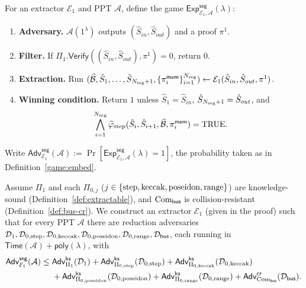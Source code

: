 \begin{definition}\label{game:segment}
For an extractor $\mathcal{E}_1$ and PPT $\mathcal{A}$, define the game
$\mathsf{Exp}^{\mathsf{seg}}_{\mathcal{E}_1,\mathcal{A}}(\lambda)$:
\begin{enumerate}
  \item \textbf{Adversary.} $\mathcal{A}(1^\lambda)$ outputs
    $(\hat{S}_{in},\hat{S}_{out})$ and a proof $\pi^1$.
  \item \textbf{Filter.} If
    $\Pi_1.\mathsf{Verify}((\hat{S}_{in},\hat{S}_{out}),\pi^1)=0$, return $0$.
  \item \textbf{Extraction.} Run
    $(\widehat{\mathcal{B}},\hat{S}_1,\ldots,\hat{S}_{N_{\mathrm{seg}}+1},\{\pi^{\mathsf{mem}}_i\}_{i=1}^{N_{\mathrm{seg}}})
    \leftarrow\mathcal{E}_1(\hat{S}_{in},\hat{S}_{out},\pi^1)$.
  \item \textbf{Winning condition.} Return $1$ unless
    $\hat{S}_1=\hat{S}_{in}$, $\hat{S}_{N_{\mathrm{seg}}+1}=\hat{S}_{out}$, and
    \[
      \bigwedge_{i=1}^{N_{\mathrm{seg}}}\widehat{\varphi}_{\mathrm{step}}(\hat{S}_i,\hat{S}_{i+1},\widehat{\mathcal{B}},\pi^{\mathsf{mem}}_i)=\mathrm{TRUE}.
    \]
\end{enumerate}
Write $\mathsf{Adv}^{\mathsf{seg}}_{\mathcal{E}_1}(\mathcal{A}) :=
\Pr[\mathsf{Exp}^{\mathsf{seg}}_{\mathcal{E}_1,\mathcal{A}}(\lambda)=1]$,
the probability taken as in Definition~\ref{game:embed}.
\end{definition}

\begin{lemma}\label{lem:segment}
Assume $\Pi_1$ and each $\Pi_{0,j}$ ($j\in\{\mathrm{step},\mathrm{keccak},\mathrm{poseidon},\mathrm{range}\}$)
are knowledge-sound (Definition~\ref{def:extractable}), and $\mathrm{Com}_{\mathsf{bus}}$
is collision-resistant (Definition~\ref{def:bus-cr}). We construct an extractor
$\mathcal{E}_1$ (given in the proof) such that for every PPT $\mathcal{A}$ there are reduction
adversaries
$\mathcal{D}_1,\mathcal{D}_{0,\mathrm{step}},\mathcal{D}_{0,\mathrm{keccak}},\mathcal{D}_{0,\mathrm{poseidon}},\mathcal{D}_{0,\mathrm{range}},\mathcal{D}_{\mathsf{bus}}$,
each running in $\mathsf{Time}(\mathcal{A})+\mathsf{poly}(\lambda)$, with
\begin{align*}
  \mathsf{Adv}^{\mathsf{seg}}_{\mathcal{E}_1}(\mathcal{A})
  \le{}& \mathsf{Adv}^{\mathsf{ks}}_{\Pi_1}(\mathcal{D}_1)
  + \mathsf{Adv}^{\mathsf{ks}}_{\Pi_{0,\mathrm{step}}}(\mathcal{D}_{0,\mathrm{step}})
  + \mathsf{Adv}^{\mathsf{ks}}_{\Pi_{0,\mathrm{keccak}}}(\mathcal{D}_{0,\mathrm{keccak}})\\
  &+ \mathsf{Adv}^{\mathsf{ks}}_{\Pi_{0,\mathrm{poseidon}}}(\mathcal{D}_{0,\mathrm{poseidon}})
  + \mathsf{Adv}^{\mathsf{ks}}_{\Pi_{0,\mathrm{range}}}(\mathcal{D}_{0,\mathrm{range}})
  + \mathsf{Adv}^{\mathsf{cr}}_{\mathrm{Com}_{\mathsf{bus}}}(\mathcal{D}_{\mathsf{bus}}).
\end{align*}
\end{lemma}

